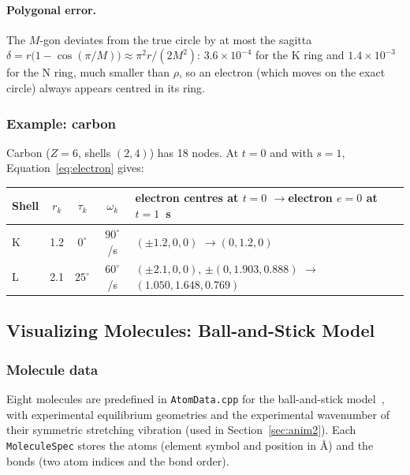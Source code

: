 \documentclass[a4paper, 11pt]{article}
\newcommand{\code}[1]{\texttt{#1}}
\begin{document}
\paragraph{Polygonal error.} The $M$-gon deviates from the true circle by at most the sagitta
$\delta=r\bigl(1-\cos(\pi/M)\bigr)\approx\pi^2 r/(2M^2)$: $3.6\times10^{-4}$ for the K ring and $1.4\times10^{-3}$ for the N ring, much smaller
than $\rho$, so an electron (which moves on the exact circle) always appears centred in its ring.

\subsubsection{Example: carbon}

Carbon ($Z=6$, shells $(2,4)$) has 18 nodes. At $t=0$ and with $s=1$, Equation~\eqref{eq:electron} gives:

\begin{center}
\small
\begin{tabular}{@{}lcccl@{}}
\toprule
Shell & $r_k$ & $\tau_k$ & $\omega_k$ & electron centres at $t=0$ \quad$\to$\quad electron $e=0$ at $t=1$~s\\
\midrule
K & 1.2 & $0^\circ$  & $90^\circ$/s & $(\pm1.2,0,0)$ \quad$\to$\quad $(0,1.2,0)$\\
L & 2.1 & $25^\circ$ & $60^\circ$/s & $(\pm2.1,0,0)$, $\pm(0,1.903,0.888)$ \quad$\to$\quad $(1.050,1.648,0.769)$\\
\bottomrule
\end{tabular}
\end{center}

\subsection{Visualizing Molecules: Ball-and-Stick Model}\label{sec:ballstick}

\subsubsection{Molecule data}

Eight molecules are predefined in \code{AtomData.cpp} for the ball-and-stick model~\cite{ballstick}, with experimental equilibrium geometries and the experimental wavenumber of their
symmetric stretching vibration (used in Section~\ref{sec:anim2}). Each \code{MoleculeSpec} stores the atoms (element symbol and position in
{\AA}) and the bonds (two atom indices and the bond order).
\end{document}
